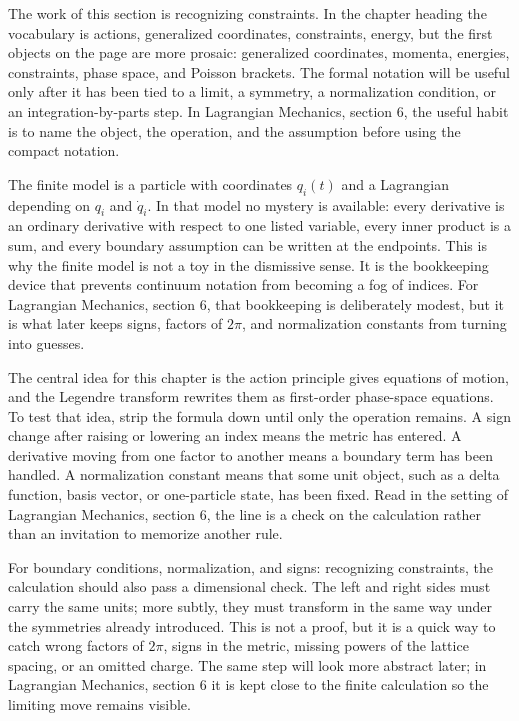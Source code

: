 The work of this section is recognizing constraints.  In the chapter heading the vocabulary is actions, generalized coordinates, constraints, energy, but the first objects on the page are more prosaic: generalized coordinates, momenta, energies, constraints, phase space, and Poisson brackets.  The formal notation will be useful only after it has been tied to a limit, a symmetry, a normalization condition, or an integration-by-parts step.  In Lagrangian Mechanics, section 6, the useful habit is to name the object, the operation, and the assumption before using the compact notation.

The finite model is a particle with coordinates \(q_i(t)\) and a Lagrangian depending on \(q_i\) and \(\dot q_i\).  In that model no mystery is available: every derivative is an ordinary derivative with respect to one listed variable, every inner product is a sum, and every boundary assumption can be written at the endpoints.  This is why the finite model is not a toy in the dismissive sense.  It is the bookkeeping device that prevents continuum notation from becoming a fog of indices.  For Lagrangian Mechanics, section 6, that bookkeeping is deliberately modest, but it is what later keeps signs, factors of \(2\pi\), and normalization constants from turning into guesses.

The central idea for this chapter is the action principle gives equations of motion, and the Legendre transform rewrites them as first-order phase-space equations.  To test that idea, strip the formula down until only the operation remains.  A sign change after raising or lowering an index means the metric has entered.  A derivative moving from one factor to another means a boundary term has been handled.  A normalization constant means that some unit object, such as a delta function, basis vector, or one-particle state, has been fixed.  Read in the setting of Lagrangian Mechanics, section 6, the line is a check on the calculation rather than an invitation to memorize another rule.

For boundary conditions, normalization, and signs: recognizing constraints, the calculation should also pass a dimensional check.  The left and right sides must carry the same units; more subtly, they must transform in the same way under the symmetries already introduced.  This is not a proof, but it is a quick way to catch wrong factors of \(2\pi\), signs in the metric, missing powers of the lattice spacing, or an omitted charge.  The same step will look more abstract later; in Lagrangian Mechanics, section 6 it is kept close to the finite calculation so the limiting move remains visible.

